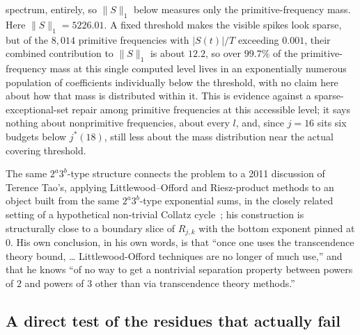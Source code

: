 \documentclass[11pt]{amsart}
\theoremstyle{plain}
\theoremstyle{definition}
\theoremstyle{remark}
\begin{document}
spectrum, entirely, so $\|S\|_1$ below measures only the primitive-frequency mass. Here
$\|S\|_1=5226.01$. A fixed threshold makes the visible spikes look sparse, but of the $8{,}014$
primitive frequencies with $|S(t)|/T$ exceeding $0.001$, their combined contribution to $\|S\|_1$ is
about $12.2$, so over $99.7\%$ of the primitive-frequency mass at this single computed level lives in
an exponentially numerous population of coefficients individually below the threshold, with no claim
here about how that mass is distributed within it. This is evidence
against a sparse-exceptional-set repair among primitive frequencies at this accessible level; it
says nothing about nonprimitive frequencies, about every $l$, and, since $j=16$ sits six budgets
below $j^*(18)$, still less about the mass distribution near the actual covering threshold.

The same $2^a3^b$-type structure connects the problem to a 2011 discussion of Terence
Tao's, applying Littlewood--Offord and Riesz-product methods to an object built from the same
$2^a3^b$-type exponential sums, in the closely related setting of a hypothetical non-trivial
Collatz cycle~\cite{tao2011blog}; his construction is structurally close to a boundary slice of
$R_{j,k}$ with the bottom exponent pinned at $0$. His own conclusion, in his own words, is that
``once one uses the transcendence theory bound, \dots{} Littlewood-Offord techniques are no longer
of much use,'' and that he knows ``of no way to get a nontrivial separation property between powers
of $2$ and powers of $3$ other than via transcendence theory methods.''

\subsection{A direct test of the residues that actually fail}
\end{document}
